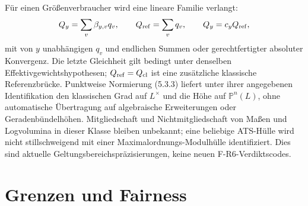 \documentclass[11pt,a4paper]{article}
\begin{document}
Für einen Größenverbraucher wird eine lineare Familie verlangt:
\[
 Q_y=\sum_v\beta_{y,v}q_v,\qquad Q_{\rm ref}=\sum_v q_v,
 \qquad Q_y=c_yQ_{\rm ref},
\]
mit von $y$ unabhängigen $q_v$ und endlichen Summen oder gerechtfertigter
absoluter Konvergenz. Die letzte Gleichheit gilt bedingt unter denselben
Effektivgewichtshypothesen; $Q_{\rm ref}=Q_{\rm cl}$ ist eine zusätzliche
klassische Referenzbrücke. Punktweise Normierung (5.3.3) liefert unter ihrer
angegebenen Identifikation den klassischen Grad auf $L^\times$ und die
Höhe auf $\mathbb P^n(L)$, ohne automatische Übertragung auf algebraische
Erweiterungen oder Geradenbündelhöhen. Mitgliedschaft und Nichtmitgliedschaft
von Maßen und Logvolumina in dieser Klasse bleiben unbekannt; eine beliebige
ATS-Hülle wird nicht stillschweigend mit einer Maximalordnungs-Modulhülle
identifiziert. Dies sind aktuelle Geltungsbereichspräzisierungen, keine
neuen F-R6-Verdiktscodes.

\section{Grenzen und Fairness}\label{sec:limits}
\end{document}
